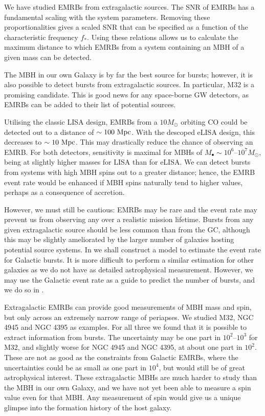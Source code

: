We have studied EMRBs from extragalactic sources. The SNR of EMRBs has a fundamental scaling with the system parameters. Removing these proportionalities gives a scaled SNR that can be specified as a function of the characteristic frequency $f_\ast$. Using these relations allows us to calculate the maximum distance to which EMRBs from a system containing an MBH of a given mass can be detected.

The MBH in our own Galaxy is by far the best source for bursts; however, it is also possible to detect bursts from extragalactic sources. In particular, M32 is a promising candidate. This is good news for any space-borne GW detectors, as EMRBs can be added to their list of potential sources.

Utilising the classic LISA design, EMRBs from a $10 M_\odot$ orbiting CO could be detected out to a distance of $\sim 100~\mathrm{Mpc}$. With the descoped eLISA design, this decreases to $\sim 10~\mathrm{Mpc}$. This may drastically reduce the chance of observing an EMRB. For both detectors, sensitivity is maximal for MBHs of $M_\bullet \sim 10^6$--$10^7 M_\odot$, being at slightly higher masses for LISA than for eLISA. We can detect bursts from systems with high MBH spins out to a greater distance; hence, the EMRB event rate would be enhanced if MBH spins naturally tend to higher values, perhaps as a consequence of accretion.

However, we must still be cautious: EMRBs may be rare and the event rate may prevent us from observing any over a realistic mission lifetime. Bursts from any given extragalactic source should be less common than from the GC, although this may be slightly ameliorated by the larger number of galaxies hosting potential source systems. In  we shall construct a model to estimate the event rate for Galactic bursts. It is more difficult to perform a similar estimation for other galaxies as we do not have as detailed astrophysical measurement. However, we may use the Galactic event rate as a guide to predict the number of bursts, and we do so in .

Extragalactic EMRBs can provide good measurements of MBH mass and spin, but only across an extremely narrow range of periapses. We studied M32, NGC 4945 and NGC 4395 as examples. For all three we found that it is possible to extract information from bursts. The uncertainty may be one part in $10^2$--$10^3$ for M32, and slightly worse for NGC 4945 and NGC 4395, at about one part in $10^2$. These are not as good as the constraints from Galactic EMRBs, where the uncertainties could be as small as one part in $10^4$, but would still be of great astrophysical interest. These extragalactic MBHs are much harder to study than the MBH in our own Galaxy, and we have not yet been able to measure a spin value even for that MBH. Any measurement of spin would give us a unique glimpse into the formation history of the host galaxy.

